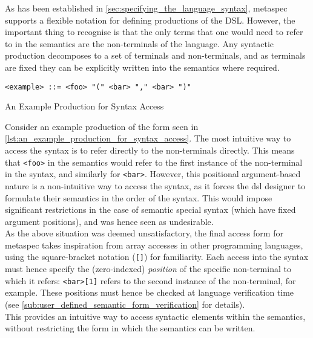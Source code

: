 As has been established in \autoref{sec:specifying_the_language_syntax}, \gls{metaspec} supports a flexible notation for defining productions of the DSL. 
However, the important thing to recognise is that the only terms that one would need to refer to in the semantics are the non-terminals of the language. 
Any syntactic production decomposes to a set of terminals and non-terminals, and as terminals are fixed they can be explicitly written into the semantics where required. \\

\begin{listing}[!htb]
\begin{verbatim}
<example> ::= <foo> "(" <bar> "," <bar> ")"
\end{verbatim}
\caption{An Example Production for Syntax Access}
\label{lst:an_example_production_for_syntax_access}
\end{listing}

Consider an example production of the form seen in \autoref{lst:an_example_production_for_syntax_access}. 
The most intuitive way to access the syntax is to refer directly to the non-terminals directly.
This means that \texttt{<foo>} in the semantics would refer to the first instance of the non-terminal in the syntax, and similarly for \texttt{<bar>}.
However, this positional argument-based nature is a non-intuitive way to access the syntax, as it forces the \gls{dsl} designer to formulate their semantics in the order of the syntax. 
This would impose significant restrictions in the case of semantic special syntax (which have fixed argument positions), and was hence seen as undesirable.\\

As the above situation was deemed unsatisfactory, the final access form for \gls{metaspec} takes inspiration from array accesses in other programming languages, using the square-bracket notation (\texttt{[]}) for familiarity.
Each access into the syntax must hence specify the (zero-indexed) \textit{position} of the specific non-terminal to which it refers: \texttt{<bar>[1]} refers to the second instance of the non-terminal, for example.
These positions must hence be checked at language verification time (see \autoref{sub:user_defined_semantic_form_verification} for details).\\

This provides an intuitive way to access syntactic elements within the semantics, without restricting the form in which the semantics can be written. 

